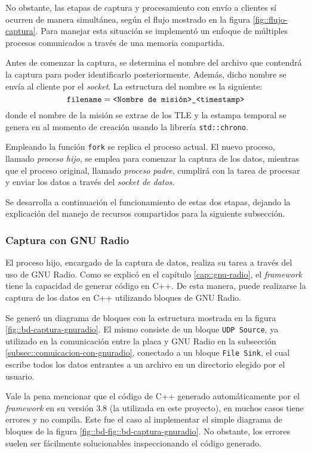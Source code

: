 \documentclass[../../main.tex]{subfiles}
\begin{document}
No obstante, las etapas de captura y procesamiento con envío a clientes sí ocurren de manera simultánea, según el flujo mostrado en la figura \ref{fig::flujo-captura}. Para manejar esta situación se implementó un enfoque de múltiples procesos comunicados a través de una memoria compartida. 

Antes de comenzar la captura, se determina el nombre del archivo que contendrá la captura para poder identificarlo posteriormente. Además, dicho nombre se envía al cliente por el \textit{socket}. La estructura del nombre es la siguiente:
\[\texttt{filename} = \texttt{<Nombre de misión>\_<timestamp>\\}\]
donde el nombre de la misión se extrae de los TLE y la estampa temporal se genera en al momento de creación usando la librería \texttt{std::chrono}.

Empleando la función \texttt{fork} se replica el proceso actual. El nuevo proceso, llamado \textit{proceso hijo}, se emplea para comenzar la captura de los datos, mientras que el proceso original, llamado \textit{proceso padre}, cumplirá con la tarea de procesar y enviar los datos a través del \textit{socket de datos}.

Se desarrolla a continuación el funcionamiento de estas dos etapas, dejando la explicación del manejo de recursos compartidos para la siguiente subsección.

\subsubsection{Captura con GNU Radio}
El proceso hijo, encargado de la captura de datos, realiza su tarea a través del uso de GNU Radio. Como se explicó en el capítulo \ref{cap::gnu-radio}, el \textit{framework} tiene la capacidad de generar código en C++. De esta manera, puede realizarse la captura de los datos en C++ utilizando bloques de GNU Radio.

Se generó un diagrama de bloques con la estructura mostrada en la figura \ref{fig::bd-captura-gnuradio}. El mismo consiste de un bloque \texttt{UDP Source}, ya utilizado en la comunicación entre la placa y GNU Radio en la subsección \ref{subsec::comuicacion-con-gnuradio}, conectado a un bloque \texttt{File Sink}, el cual escribe todos los datos entrantes a un archivo en un directorio elegido por el usuario.

Vale la pena mencionar que el código de C++ generado automáticamente por el \textit{framework} en su versión 3.8 (la utilizada en este proyecto), en muchos casos tiene errores y no compila. Este fue el caso al implementar el simple diagrama de bloques de la figura \ref{fig::bd-fig::bd-captura-gnuradio}. No obstante, los errores suelen ser fácilmente solucionables inspeccionando el código generado.
\end{document}
